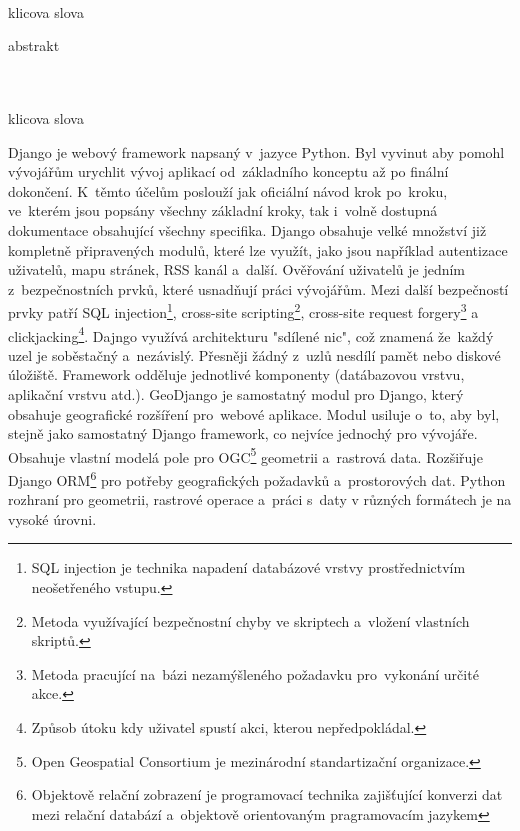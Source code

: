 \documentclass[12pt]{article}%
\begin{document}
{{}
\\
{klicova slova}

{abstrakt}
\\
\\
{{}
\\
{klicova slova}

\obsah





Django je webový framework napsaný v~jazyce Python. Byl vyvinut aby pomohl vývojářům urychlit 
vývoj aplikací od~základního konceptu až po finální dokončení. K~těmto účelům poslouží jak oficiální 
návod krok po~kroku, ve~kterém jsou popsány všechny základní kroky, tak i~volně dostupná 
dokumentace obsahující všechny specifika. Django obsahuje velké množství již kompletně připravených 
modulů, které lze využít, jako jsou například autentizace uživatelů, mapu stránek, RSS kanál a~další. 
Ověřování uživatelů je jedním z~bezpečnostních prvků, které usnadňují práci vývojářům. Mezi další
bezpečností prvky patří SQL injection\footnote{SQL injection je technika napadení databázové vrstvy 
prostřednictvím neošetřeného vstupu.}, cross-site scripting\footnote{Metoda využívající bezpečnostní 
chyby ve skriptech a~vložení vlastních skriptů.}, cross-site request forgery\footnote{Metoda 
pracující na~bázi nezamýšleného požadavku pro~vykonání určité akce.} a clickjacking\footnote{Způsob 
útoku kdy uživatel spustí akci, kterou nepředpokládal.}. Dajngo využívá architekturu "sdílené nic", 
což znamená že~každý uzel je soběstačný a~nezávislý. Přesněji žádný z~uzlů nesdílí pamět nebo 
diskové úložiště. Framework odděluje jednotlivé komponenty (datábazovou vrstvu, aplikační vrstvu 
atd.).
GeoDjango je samostatný modul pro Django, který obsahuje geografické rozšíření pro~webové aplikace. 
Modul usiluje o~to, aby byl, stejně jako samostatný Django framework, co nejvíce jednochý pro 
vývojáře. Obsahuje vlastní modelá pole pro OGC\footnote{Open Geospatial Consortium je mezinárodní 
standartizační organizace.} geometrii a~rastrová data. Rozšiřuje Django ORM\footnote{Objektově 
relační zobrazení je programovací technika zajišťující konverzi dat mezi relační databází 
a~objektově orientovaným pragramovacím jazykem} pro potřeby geografických požadavků a~prostorových 
dat. Python rozhraní pro geometrii, rastrové operace a~práci s~daty v různých formátech je na 
vysoké úrovni.

}}
\end{document}
